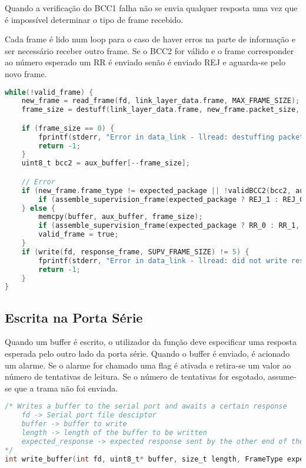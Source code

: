 Quando a verificação do BCC1 falha não se envia qualquer resposta uma vez que é impossível determinar o tipo de frame recebido.

Cada frame é lido num loop para o caso de haver erros na parte de informação e ser necessário receber outro frame. Se o BCC2 for válido e o frame corresponder ao número esperado um RR é enviado senão é enviado REJ e aguarda-se pelo novo frame.

\begin{lstlisting}[language=C, caption=Código em C do loop responsével pela leitura da porta série, em llread]
while(!valid_frame) {
    new_frame = read_frame(fd, link_layer_data.frame, MAX_FRAME_SIZE);
    frame_size = destuff(link_layer_data.frame, new_frame.packet_size, aux_buffer, MAX_PACKET_SIZE + 1);

    if (frame_size == 0) {
        fprintf(stderr, "Error in data_link - llread: destuffing packet unsuccessfull\n");
        return -1;
    }
    uint8_t bcc2 = aux_buffer[--frame_size];

    // Error
    if (new_frame.frame_type != expected_package || !validBCC2(bcc2, aux_buffer, frame_size)) {
        if (assemble_supervision_frame(expected_package ? REJ_1 : REJ_0, RECEIVER, response_frame) == -1) return -1;
    } else {
        memcpy(buffer, aux_buffer, frame_size);
        if (assemble_supervision_frame(expected_package ? RR_0 : RR_1, RECEIVER, response_frame) == -1) return -1;
        valid_frame = true;
    }
    if (write(fd, response_frame, SUPV_FRAME_SIZE) != 5) {
        fprintf(stderr, "Error in data_link - llread: did not write response frame correctly");
        return -1;
    }
}
\end{lstlisting}

\subsection{Escrita na Porta Série}

Quando um buffer é escrito, o utilizador da função deve especificar uma resposta esperada pelo outro lado da porta série. Quando o buffer é enviado, é acionado um alarme. Se o alarme for chamado uma flag é ativada e retira-se um valor ao número de tentativas de leitura. Se o número de tentativas for esgotado, assume-se que a trama não foi enviada.
\begin{lstlisting}[language=C, caption=Código em C da função responsável pela escrita na porta série]
/* Writes a buffer to the serial port and awaits a certain response
    fd -> Serial port file desciptor
    buffer -> buffer to write
    length -> length of the buffer to be written
    expected_response -> expected response sent by the other end of the serial port
*/
int write_buffer(int fd, uint8_t* buffer, size_t length, FrameType expected_response) 
\end{lstlisting}

